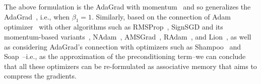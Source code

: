 The above formulation is the AdaGrad with momentum~\citep{defossez2022a} and so generalizes the AdaGrad~\citep{duchi2011adaptive}, i.e., when $\beta_1 = 1$. Similarly, based on the connection of Adam optimizer~\citep{kingma2014adam} with other algorithms such as RMSProp~\citep{hinton2012neural}, SignSGD and its momentum-based variants~\citep{bernstein2018signsgd}, NAdam~\citep{dozat2016incorporating}, AMSGrad~\citep{reddi2016stochastic}, RAdam~\citep{Liu2020On}, and Lion~\citep{chen2023symbolic}, as well as considering AdaGrad's connection with optimizers such as Shampoo~\citep{gupta2018shampoo} and Soap~\citep{vyas2025soap}–i.e., as the approximation of the preconditioning term–we can conclude that all these optimizers can be re-formulated as associative memory that aims to compress the gradients. 












